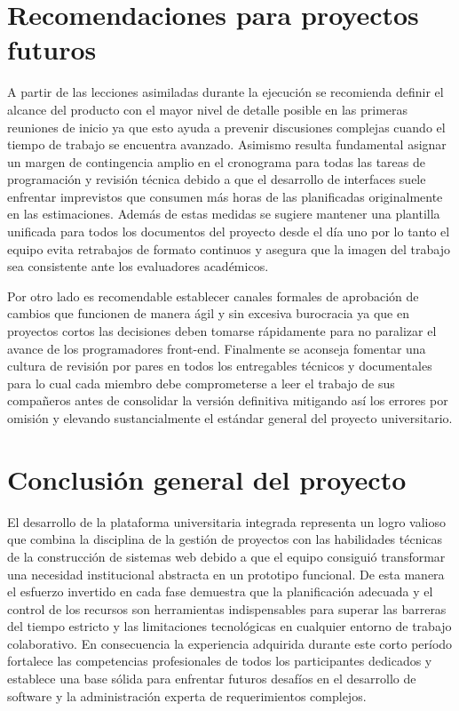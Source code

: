 \documentclass[11pt,spanish]{article}
\begin{document}
\section{Recomendaciones para proyectos futuros}

A partir de las lecciones asimiladas durante la ejecución se recomienda definir el alcance del producto con el mayor nivel de detalle posible en las primeras reuniones de inicio ya que esto ayuda a prevenir discusiones complejas cuando el tiempo de trabajo se encuentra avanzado. Asimismo resulta fundamental asignar un margen de contingencia amplio en el cronograma para todas las tareas de programación y revisión técnica debido a que el desarrollo de interfaces suele enfrentar imprevistos que consumen más horas de las planificadas originalmente en las estimaciones. Además de estas medidas se sugiere mantener una plantilla unificada para todos los documentos del proyecto desde el día uno por lo tanto el equipo evita retrabajos de formato continuos y asegura que la imagen del trabajo sea consistente ante los evaluadores académicos.

Por otro lado es recomendable establecer canales formales de aprobación de cambios que funcionen de manera ágil y sin excesiva burocracia ya que en proyectos cortos las decisiones deben tomarse rápidamente para no paralizar el avance de los programadores front-end. Finalmente se aconseja fomentar una cultura de revisión por pares en todos los entregables técnicos y documentales para lo cual cada miembro debe comprometerse a leer el trabajo de sus compañeros antes de consolidar la versión definitiva mitigando así los errores por omisión y elevando sustancialmente el estándar general del proyecto universitario.

\section{Conclusión general del proyecto}

El desarrollo de la plataforma universitaria integrada representa un logro valioso que combina la disciplina de la gestión de proyectos con las habilidades técnicas de la construcción de sistemas web debido a que el equipo consiguió transformar una necesidad institucional abstracta en un prototipo funcional. De esta manera el esfuerzo invertido en cada fase demuestra que la planificación adecuada y el control de los recursos son herramientas indispensables para superar las barreras del tiempo estricto y las limitaciones tecnológicas en cualquier entorno de trabajo colaborativo. En consecuencia la experiencia adquirida durante este corto período fortalece las competencias profesionales de todos los participantes dedicados y establece una base sólida para enfrentar futuros desafíos en el desarrollo de software y la administración experta de requerimientos complejos.
\end{document}
